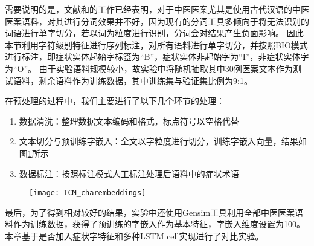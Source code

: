 需要说明的是，文献和的工作已经表明，对于中医医案尤其是使用古代汉语的中医医案语料，对其进行分词效果并不好，因为现有的分词工具多倾向于将无法识别的词语进行单字切分，若以词为粒度进行识别，分词会对结果产生负面影响。
因此本节利用字符级别特征进行序列标注，对所有语料进行单字切分，并按照BIO模式进行标注，即症状实体起始字标签为“B”，症状实体非起始字为“I”，非症状实体字为“O”。
由于实验语料规模较小，故实验中将随机抽取其中30例医案文本作为测试语料，剩余语料作为训练数据，其中训练集与验证集比例为9:1。

在预处理的过程中，我们主要进行了以下几个环节的处理：
\begin{enumerate}[leftmargin=*]
    \item[(1)] 数据清洗：整理数据文本编码和格式，标点符号以空格代替
    \item[(2)] 文本切分与预训练字嵌入：全文以字粒度进行切分，训练字嵌入向量，结果如图\ref{fig:TCM_charembeddings}所示
    \item[(3)] 数据标注：按照标注模式人工标注处理后语料中的症状术语
\end{enumerate}

\begin{figure}[H]
    \centering
    \texttt{[image: TCM\_charembeddings]}
    \label{fig:TCM_charembeddings}
\end{figure}

最后，为了得到相对较好的结果，实验中还使用Gensim工具利用全部中医医案语料作为训练数据，获得了预训练的字嵌入作为基本特征，字嵌入维度设置为100。
本章基于是否加入症状字特征和多种LSTM cell实现进行了对比实验。

